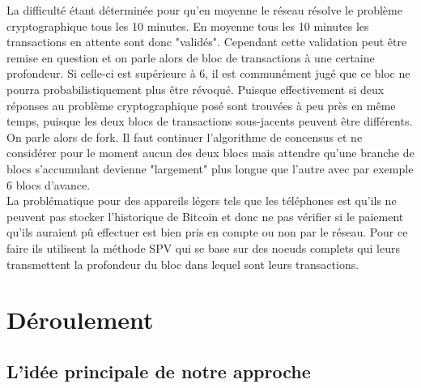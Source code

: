 \documentclass[12pt,a4paper]{article}
\begin{document}
	La difficulté étant déterminée pour qu'en moyenne le réseau résolve le problème cryptographique tous les 10 minutes. En moyenne tous les 10 minutes les transactions en attente sont donc "validés". Cependant cette validation peut être remise en question et on parle alors de bloc de transactions à une certaine profondeur. Si celle-ci est supérieure à 6, il est communément jugé que ce bloc ne pourra probabilistiquement plus être révoqué. Puisque effectivement si deux réponses au problème cryptographique posé sont trouvées à peu près en même temps, puisque les deux blocs de transactions sous-jacents peuvent être différents. On parle alors de fork. Il faut continuer l'algorithme de concensus et ne considérer pour le moment aucun des deux blocs mais attendre qu'une branche de blocs s'accumulant devienne "largement" plus longue que l'autre avec par exemple 6 blocs d'avance.\\ %
	La problématique pour des appareils légers tels que les téléphones est qu'ils ne peuvent pas stocker l'historique de Bitcoin et donc ne pas vérifier si le paiement qu'ils auraient pû effectuer est bien pris en compte ou non par le réseau. Pour ce faire ils utilisent la méthode SPV qui se base sur des noeuds complets qui leurs transmettent la profondeur du bloc dans lequel sont leurs transactions. %
		
	\section{Déroulement} %
	
	\subsection{L'idée principale de notre approche}
	
\end{document}
